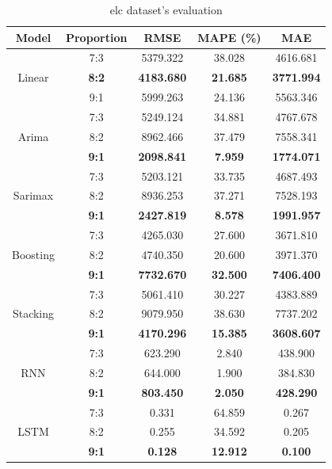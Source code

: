 \documentclass[conference]{IEEEtran}
\begin{document}
\begin{table}[H]
    \centering
    \caption{elc dataset's evaluation}
    \begin{tabular}{|c|c|c|c|c|}
     \hline
       \rule{0pt}{2ex}
        \centering Model & Proportion & RMSE & MAPE (\%) & MAE \\
        \hline
        \multirow{3}{*}{Linear} & 7:3 & 5379.322 & 38.028 & 4616.681 \\ 
         & \textbf{8:2} & \textbf{4183.680} & \textbf{21.685} & \textbf{3771.994} \\ 
         & 9:1 & 5999.263 & 24.136 & 5563.346 \\
         \hline
         \multirow{3}{*}{Arima} & 7:3 & 5249.124 & 34.881 & 4767.678 \\ 
         & 8:2 & 8962.466 & 37.479 & 7558.341 \\ 
         & \textbf{9:1} & \textbf{2098.841} & \textbf{7.959} & \textbf{1774.071} \\
         \hline
         \multirow{3}{*}{Sarimax} & 7:3 & 5203.121 & 33.735 & 4687.493 \\ 
         & 8:2 & 8936.253 & 37.271 & 7528.193 \\ 
         & \textbf{9:1} & \textbf{2427.819} & \textbf{8.578} & \textbf{1991.957} \\
         \hline
         \multirow{3}{*}{Boosting} & 7:3 & 4265.030 & 27.600 & 3671.810 \\ 
         & 8:2 & 4740.350 & 20.600 & 3971.370 \\ 
         & \textbf{9:1} & \textbf{7732.670} & \textbf{32.500} & \textbf{7406.400} \\
         \hline
         \multirow{3}{*}{Stacking} & 7:3 & 5061.410 & 30.227 & 4383.889 \\ 
         & 8:2 & 9079.950 & 38.630 & 7737.202 \\ 
         & \textbf{9:1} & \textbf{4170.296} & \textbf{15.385} & \textbf{3608.607} \\
         \hline
         \multirow{3}{*}{RNN} & 7:3 & 623.290 & 2.840 & 438.900 \\ 
         & 8:2 & 644.000 & 1.900 & 384.830 \\ 
         & \textbf{9:1} & \textbf{803.450} & \textbf{2.050} & \textbf{428.290} \\
         \hline
         \multirow{3}{*}{LSTM} & 7:3 & 0.331 & 64.859 & 0.267 \\ 
         & 8:2 & 0.255 & 34.592 & 0.205 \\ 
         & \textbf{9:1} & \textbf{0.128} & \textbf{12.912} & \textbf{0.100} \\

\end{tabular}
\end{table}
\end{document}
